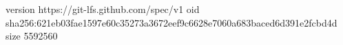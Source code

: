 version https://git-lfs.github.com/spec/v1
oid sha256:621eb03fae1597e60c35273a3672eef9c6628e7060a683baced6d391e2fcbd4d
size 5592560
